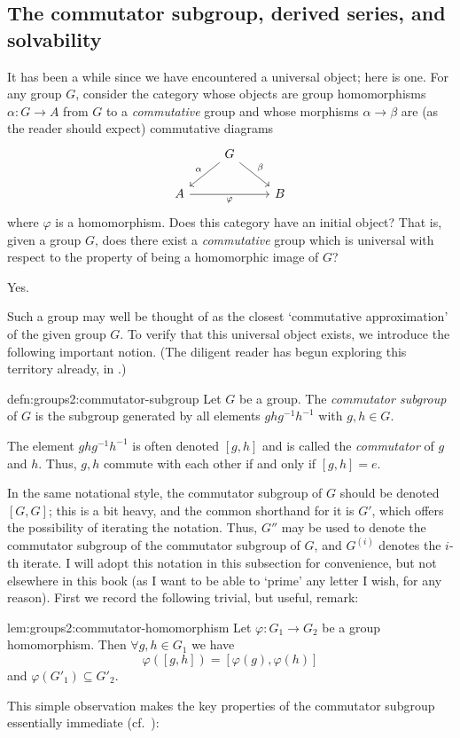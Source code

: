 \subsection{The commutator subgroup, derived series, and solvability}
\label{subsec:groups2:the-commutator-subgroup-derived-series-and-solvability}
It has been a while since we have encountered a universal object; here
is one. For any group $G$, consider the category whose objects are
group homomorphisms $\alpha : G \to A$ from $G$ to a
\emph{commutative} group and whose morphisms $\alpha \to \beta$ are
(as the reader should expect) commutative diagrams
\[
  \begin{tikzcd}
    & G \arrow[dl, "\alpha"'] \arrow[dr, "\beta"] & \\
    A \arrow[rr, "\varphi"'] & & B
  \end{tikzcd}
\]
where $\varphi$ is a homomorphism.  Does this category have an initial
object? That is, given a group $G$, does there exist a
\emph{commutative} group which is universal with respect to the
property of being a homomorphic image of $G$?

Yes.

Such a group may well be thought of as the closest `commutative
approximation' of the given group $G$. To verify that this universal
object exists, we introduce the following important notion. (The
diligent reader has begun exploring this territory already, in
.)
\begin{defn}{}{defn:groups2:commutator-subgroup}
  Let $G$ be a group. The \emph{commutator subgroup} of $G$ is the
  subgroup generated by all elements $ghg^{-1}h^{-1}$ with
  $g, h \in G$.
\end{defn}
The element $ghg^{-1}h^{-1}$ is often denoted $[g,h]$ and is called
the \emph{commutator} of $g$ and $h$. Thus, $g, h$ commute with each
other if and only if $[g,h] = e$.

In the same notational style, the commutator subgroup of $G$ should be
denoted $[G,G]$; this is a bit heavy, and the common shorthand for it
is $G'$, which offers the possibility of iterating the notation. Thus,
$G''$ may be used to denote the commutator subgroup of the commutator
subgroup of $G$, and $G^{(i)}$ denotes the $i$-th iterate. I will
adopt this notation in this subsection for convenience, but not
elsewhere in this book (as I want to be able to `prime' any letter I
wish, for any reason).  First we record the following trivial, but
useful, remark:

\begin{lem}{}{lem:groups2:commutator-homomorphism}
  Let $\varphi : G_1 \to G_2$ be a group homomorphism. Then
  $\forall g, h \in G_1$ we have
  \[
    \varphi([g,h]) = [\varphi(g), \varphi(h)]
  \]
  and $\varphi(G'_1) \subseteq G'_2$.
\end{lem}
This simple observation makes the key properties of the commutator
subgroup essentially immediate (cf.\
):

